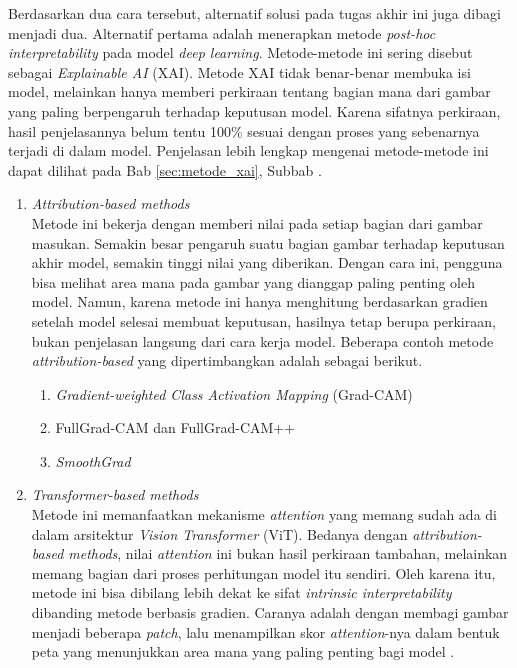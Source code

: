 Berdasarkan dua cara tersebut, alternatif solusi pada tugas akhir ini juga dibagi menjadi dua. Alternatif pertama adalah menerapkan metode \textit{post-hoc interpretability} pada model \textit{deep learning}. Metode-metode ini sering disebut sebagai \textit{Explainable AI} (XAI). Metode XAI tidak benar-benar membuka isi model, melainkan hanya memberi perkiraan tentang bagian mana dari gambar yang paling berpengaruh terhadap keputusan model. Karena sifatnya perkiraan, hasil penjelasannya belum tentu 100\% sesuai dengan proses yang sebenarnya terjadi di dalam model. Penjelasan lebih lengkap mengenai metode-metode ini dapat dilihat pada Bab \ref{sec:metode_xai}, Subbab .

\begin{enumerate}
	\item \textit{Attribution-based methods} \\
	Metode ini bekerja dengan memberi nilai pada setiap bagian dari gambar masukan. Semakin besar pengaruh suatu bagian gambar terhadap keputusan akhir model, semakin tinggi nilai yang diberikan. Dengan cara ini, pengguna bisa melihat area mana pada gambar yang dianggap paling penting oleh model. Namun, karena metode ini hanya menghitung berdasarkan gradien setelah model selesai membuat keputusan, hasilnya tetap berupa perkiraan, bukan penjelasan langsung dari cara kerja model. Beberapa contoh metode \textit{attribution-based} yang dipertimbangkan adalah sebagai berikut.
	\begin{enumerate}
		\item \textit{Gradient-weighted Class Activation Mapping} (Grad-CAM)
		
		\item FullGrad-CAM dan FullGrad-CAM++
		
		\item \textit{SmoothGrad}
	\end{enumerate}
	
	\item \textit{Transformer-based methods} \\
	Metode ini memanfaatkan mekanisme \textit{attention} yang memang sudah ada di dalam arsitektur \textit{Vision Transformer} (ViT). Bedanya dengan \textit{attribution-based methods}, nilai \textit{attention} ini bukan hasil perkiraan tambahan, melainkan memang bagian dari proses perhitungan model itu sendiri. Oleh karena itu, metode ini bisa dibilang lebih dekat ke sifat \textit{intrinsic interpretability} dibanding metode berbasis gradien. Caranya adalah dengan membagi gambar menjadi beberapa \textit{patch}, lalu menampilkan skor \textit{attention}-nya dalam bentuk peta yang menunjukkan area mana yang paling penting bagi model \autocite{iftikhar2025explainable}.
\end{enumerate}

